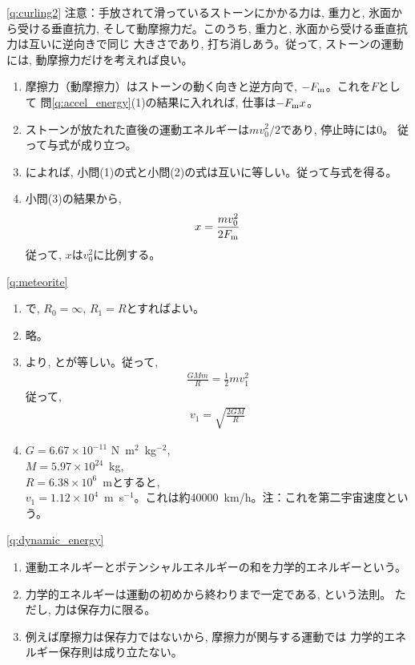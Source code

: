 \ref{q:curling2}
注意：手放されて滑っているストーンにかかる力は, 重力と, 氷面から受ける垂直抗力, 
そして動摩擦力だ。このうち, 重力と, 氷面から受ける垂直抗力は互いに逆向きで同じ
大きさであり, 打ち消しあう。従って, ストーンの運動には, 動摩擦力だけを考えれば良い。
\begin{enumerate}
\item 摩擦力（動摩擦力）はストーンの動く向きと逆方向で, $-F_{\text m}$。これを$F$として
問\ref{q:accel_energy}(1)の結果に入れれば, 仕事は$-F_{\text m}x$。
\item ストーンが放たれた直後の運動エネルギーは$mv_0^2/2$であり, 停止時には0。
従って与式が成り立つ。
\item {}によれば, 小問(1)の式と小問(2)の式は互いに等しい。従って与式を得る。
\item 小問(3)の結果から, 
\begin{eqnarray}x=\frac{mv_0^2}{2F_{\text m}}\end{eqnarray}
従って, $x$は$v_0^2$に比例する。
\end{enumerate}
\vspace{0.4cm}

\ref{q:meteorite}
\begin{enumerate}
\item {}で, $R_0=\infty$, $R_1=R$とすればよい。
\item 略。
\item {}より, とが等しい。従って, 
\begin{eqnarray}\frac{GMm}{R}=\frac{1}{2}mv_1^2\end{eqnarray}
従って, 
\begin{eqnarray}v_1=\sqrt{\frac{2GM}{R}}\end{eqnarray}
\item $G=6.67\times10^{-11}$ N~m$^2$~kg$^{-2}$, \\
$M=5.97\times10^{24}$~kg, \\
$R=6.38\times10^{6}$~mとすると, \\
$v_1=1.12\times10^4$~m~s$^{-1}$。これは約40000~km/h。注：これを第二宇宙速度という。
\end{enumerate}
\vspace{0.4cm}

%
\ref{q:dynamic_energy}
\begin{enumerate}
\item 運動エネルギーとポテンシャルエネルギーの和を力学的エネルギーという。
\item 力学的エネルギーは運動の初めから終わりまで一定である, という法則。
ただし, 力は保存力に限る。
\item 例えば摩擦力は保存力ではないから, 摩擦力が関与する運動では
力学的エネルギー保存則は成り立たない。
\end{enumerate}


